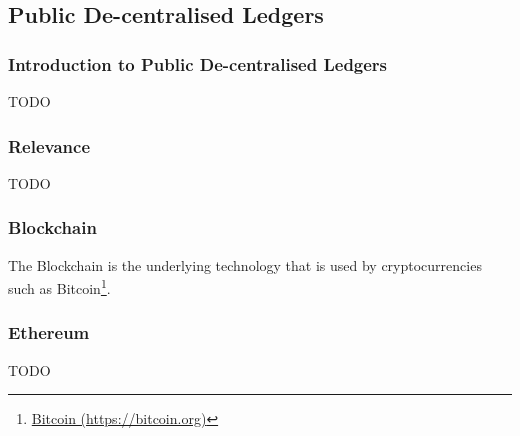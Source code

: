 \subsection{Public De-centralised Ledgers}

\subsubsection{Introduction to Public De-centralised Ledgers}

TODO

\subsubsection{Relevance}

TODO





\subsubsection{Blockchain}

The Blockchain is the underlying technology that is used by cryptocurrencies such as Bitcoin\footnote{\href{https://bitcoin.org/en/}{Bitcoin (https://bitcoin.org)}}.

\subsubsection{Ethereum}

TODO
